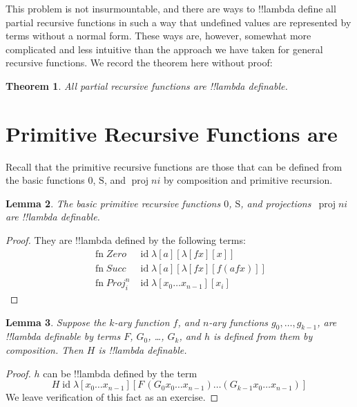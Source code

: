 \documentclass[10pt,a4paper]{article}
\theoremstyle{plain}
\newtheorem{thm}{Theorem}[section]
\newtheorem{lem}[thm]{Lemma}
\theoremstyle{definition}
\theoremstyle{remark}
\newcommand*{\olfileid}[3]{}
\newcommand*{\olsection}[1]{\section*{#1}}
\newcommand*{\ollabel}[1]{\label{#1}}
\providecommand{\Zero}{\ensuremath{0}}
\providecommand{\Succ}{\ensuremath{\mathrm{S}}}
\providecommand{\lambd}{\ensuremath{\lambda}}
\providecommand{\Proj}{\operatorname{proj}}
\providecommand{\ident}{\operatorname{id}}
\providecommand{\fn}{\operatorname{fn}}
\begin{document}
This problem is not insurmountable, and there are ways to
!!{lambda define} all partial recursive functions in such a way that
undefined values are represented by terms without a normal form.
These ways are, however, somewhat more complicated and less intuitive
than the approach we have taken for general recursive functions. We
record the theorem here without proof:

\begin{thm}
  All partial recursive functions are !!{lambda definable}.
\end{thm}






\olfileid{lam}{ldf}{prf}
\olsection{Primitive Recursive Functions are \usetoken{S}{lambda definable}} 

Recall that the primitive recursive functions are those that can be
defined from the basic functions $\Zero$, $\Succ$, and $\Proj{n}{i}$
by composition and primitive recursion.

\begin{lem}
  \ollabel{lem:basic}
  The basic primitive recursive functions $\Zero$, $\Succ$, and
  projections~$\Proj{n}{i}$ are !!{lambda definable}.
\end{lem}

\begin{proof}
They are !!{lambda define}d by the following terms:
\begin{align*}
  \fn{Zero} & \ident \lambd[a][\lambd[fx][x]]\\
  \fn{Succ} & \ident \lambd[a][\lambd[fx][f (a f x)]] \\
  \fn{Proj}^n_i & \ident \lambd[x_0\dots x_{n-1}][x_i]
\end{align*}
\end{proof}

\begin{lem}
  \ollabel{lem:comp} Suppose the $k$-ary function $f$, and $n$-ary
  functions $g_0, \dots, g_{k-1}$, are !!{lambda definable} by terms
  $F$, $G_0$, \dots, $G_k$, and $h$ is defined from them by composition.
  Then $H$ is !!{lambda definable}.
\end{lem}

\begin{proof}
  $h$ can be !!{lambda define}d by the term
  \[
  H \ident \lambd[x_0 \dots x_{n-1}][F\, (G_0 x_0 \dots
    x_{n-1}) \dots (G_{k-1} x_0 \dots x_{n-1})]
  \]
  We leave verification of this fact as an exercise.
\end{proof}
\end{document}
